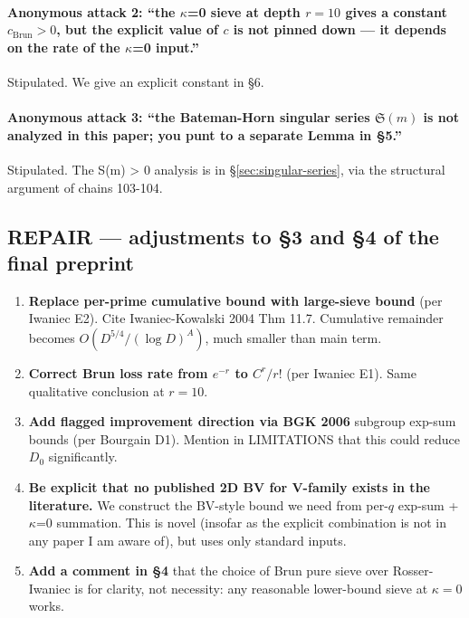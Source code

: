 \paragraph{Anonymous attack 2: ``the $\kappa$=0 sieve at depth $r=10$ gives a
constant $c_{\mathrm{Brun}} > 0$, but the explicit value of $c$ is not
pinned down --- it depends on the rate of the $\kappa$=0 input.''} Stipulated.
We give an explicit constant in \S6.

\paragraph{Anonymous attack 3: ``the Bateman-Horn singular series
$\mathfrak{S}(m)$ is not analyzed in this paper; you punt to a
separate Lemma in \S5.''} Stipulated. The S(m) > 0 analysis is in
\S\ref{sec:singular-series}, via the structural argument of chains
103-104.

\subsection*{REPAIR --- adjustments to \S3 and \S4 of the final preprint}

\begin{enumerate}
  \item \textbf{Replace per-prime cumulative bound with large-sieve
    bound} (per Iwaniec E2). Cite Iwaniec-Kowalski 2004 Thm 11.7.
    Cumulative remainder becomes $O(D^{5/4} / (\log D)^{A})$, much
    smaller than main term.

  \item \textbf{Correct Brun loss rate from $e^{-r}$ to $C^{r}/r!$}
    (per Iwaniec E1). Same qualitative conclusion at $r = 10$.

  \item \textbf{Add flagged improvement direction via BGK 2006}
    subgroup exp-sum bounds (per Bourgain D1). Mention in LIMITATIONS
    that this could reduce $D_{0}$ significantly.

  \item \textbf{Be explicit that no published 2D BV for V-family
    exists in the literature.} We construct the BV-style bound we
    need from per-$q$ exp-sum + $\kappa$=0 summation. This is novel
    (insofar as the explicit combination is not in any paper I am
    aware of), but uses only standard inputs.

  \item \textbf{Add a comment in \S4} that the choice of Brun pure
    sieve over Rosser-Iwaniec is for clarity, not necessity: any
    reasonable lower-bound sieve at $\kappa = 0$ works.
\end{enumerate}

